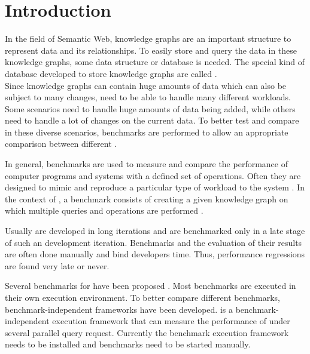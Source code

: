 \chapter{Introduction}
\label{ch:introduction}




In the field of Semantic Web, knowledge graphs are an important structure to represent data and its relationships.
To easily store and query the data in these knowledge graphs, some data structure or database is needed.
The special kind of database developed to store knowledge graphs are called \tsp{}. \\

Since knowledge graphs can contain huge amounts of data which can also be subject to many changes, \tsp{} need to be able to handle many different workloads.
Some scenarios need to handle huge amounts of data being added, while others need to handle a lot of changes on the current data.
To better test and compare \tsp{} in these diverse scenarios, benchmarks are performed to allow an appropriate comparison between different \tsp{} \cite{saleemHowRepresentativeSPARQL2019}.

In general, benchmarks are used to measure and compare the performance of computer programs and systems with a defined set of operations.
Often they are designed to mimic and reproduce a particular type of workload to the system \cite{saleemFEASIBLEFeatureBasedSPARQL2015, morseyDBpediaSPARQLBenchmark2011}.
In the context of \tsp{}, a benchmark consists of creating a given knowledge graph on which multiple queries and operations are performed \cite{conradsIguanaGenericFramework2017}.

Usually \tsp{} are developed in long iterations and are benchmarked only in a late stage of such an development iteration.
Benchmarks and the evaluation of their results are often done manually and bind developers time.
Thus, performance regressions are  found very late or never.


Several benchmarks for \tsp{} have been proposed \cite{saleemHowRepresentativeSPARQL2019}.
Most benchmarks are executed in their own execution environment.
To better compare different benchmarks, benchmark-independent frameworks have been developed.
\iguana{} is a benchmark-independent execution framework \cite{conradsIguanaGenericFramework2017} that can measure the performance of \tsp{} under several parallel query request.
Currently the benchmark execution framework needs to be installed and benchmarks need to be started manually.

